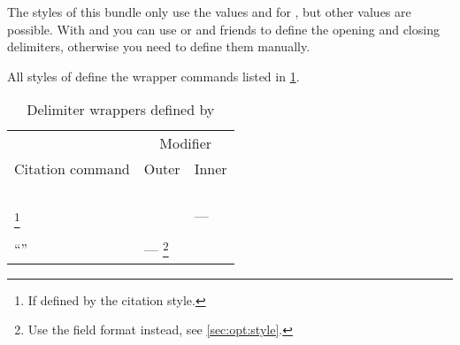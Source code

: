 \documentclass[11pt,a4paper]{article}
\begin{document}
\begin{ltxsyntax}
The styles of this bundle only use the values  and 
for , but other values are possible. With  and
 you can use  or
 and friends to define the opening and closing
delimiters, otherwise you need to define them manually.

All styles of  define the wrapper commands listed in
\cref{tab:delimwrappers}.
\begin{table}[btph]
\centering
\caption{Delimiter wrappers defined by }
\label{tab:delimwrappers}
\begin{minipage}{\linewidth}
\renewcommand\footnoterule{}
\centering
\begin{tabular}{@{}lll@{}}
\toprule
                 & \multicolumn{2}{c}{Modifier} \\
                 \cmidrule(lr){2-3}
Citation command & Outer & Inner\\
\midrule
\cmd{cite} & \cmd{mkoutercitedelims} & \cmd{mkinnercitedelims}\\
\cmd{parencite} & \cmd{mkouterparencitedelims} & \cmd{mkinnerparencitedelims}\\
\cmd{textcite} & \cmd{mkoutertextcitedelims} & \cmd{mkinnertextcitedelims}\\
\cmd{footcite} & \cmd{mkouterfootcitedelims} & \cmd{mkinnerfootcitedelims}\\
\cmd{supercite}\footnote{If defined by the citation style.}
 & \cmd{mkoutersupercitedelims} & ---\\
\cmd{bbx@xrefcite} & \cmd{mkouterbbx@xrefcitedelims} &
  \cmd{mkinnerbbx@xrefcitedelims}\\
\enquote{\cmd{bbx@introcite}} & ---%
    \footnote{Use the field format \bibfieldformat{bbx@introcite} instead,
      see \cref{sec:opt:style}.} & \cmd{mkinnerbbx@introcitedelims}\\
\bottomrule
\end{tabular}
\end{minipage}
\end{table}



\end{ltxsyntax}
\end{document}
